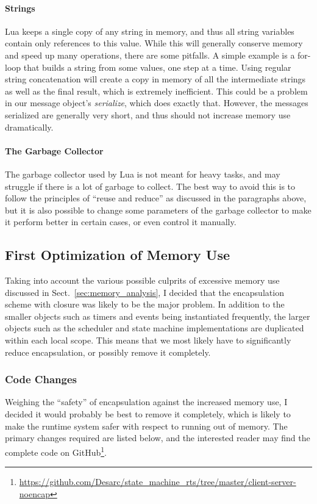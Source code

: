 \paragraph{Strings} Lua keeps a single copy of any string in memory, and thus all string variables contain only references to this value. While this will generally conserve memory and speed up many operations, there are some pitfalls. A simple example is a for-loop that builds a string from some values, one step at a time. Using regular string concatenation will create a copy in memory of all the intermediate strings as well as the final result, which is extremely inefficient. This could be a problem in our message object's \emph{serialize}, which does exactly that. However, the messages serialized are generally very short, and thus should not increase memory use dramatically.

\paragraph{The Garbage Collector} 
The garbage collector used by Lua is not meant for heavy tasks, and may struggle if there is a lot of garbage to collect. The best way to avoid this is to follow the principles of ``reuse and reduce'' as discussed in the paragraphs above, but it is also possible to change some parameters of the garbage collector to make it perform better in certain cases, or even control it manually.

\subsection{First Optimization of Memory Use}
\label{sec:first_optimalization}
Taking into account the various possible culprits of excessive memory use discussed in Sect.~\ref{sec:memory_analysis}, I decided that the encapsulation scheme with closure was likely to be the major problem. In addition to the smaller objects such as timers and events being instantiated frequently, the larger objects such as the scheduler and state machine implementations are duplicated within each local scope. This means that we most likely have to significantly reduce encapsulation, or possibly remove it completely.

\subsubsection{Code Changes}
Weighing the ``safety'' of encapsulation against the increased memory use, I decided it would probably be best to remove it completely, which is likely to make the runtime system safer with respect to running out of memory. The primary changes required are listed below, and the interested reader may find the complete code on GitHub\footnote{\url{https://github.com/Desarc/state_machine_rts/tree/master/client-server-noencap}}.

